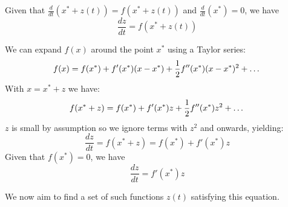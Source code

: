 \documentclass[a4paper,10pt]{article}
\begin{document}
Given that $\frac{d}{dt}(x^* + z(t)) = f(x^* + z(t))$ and
$\frac{d}{dt}(x^*) = 0$, we have
\[
	\frac{dz}{dt} = f(x^* + z(t))
\]

We can expand $f(x)$ around the point $x^*$ using a Taylor series:
\[
	f(x) = f(x^*) + f'(x^*)(x - x^*) + \frac{1}{2}f''(x^*)(x - x^*)^2 + \dots \\
\]
With $x = x^* + z$ we have:
\[
	f(x^* + z) = f(x^*) + f'(x^*)z + \frac{1}{2}f''(x^*)z^2 + \dots \\
\]
$z$ is small by assumption so we ignore terms with $z^2$ and onwards, yielding:
\[
	\frac{dz}{dt} = f(x^* + z) = f(x^*) + f'(x^*)z
\]
Given that $f(x^*) = 0$, we have
\[
	\frac{dz}{dt} = f'(x^*)z
\]

We now aim to find a set of such functions $z(t)$ satisfying this equation.
\end{document}
